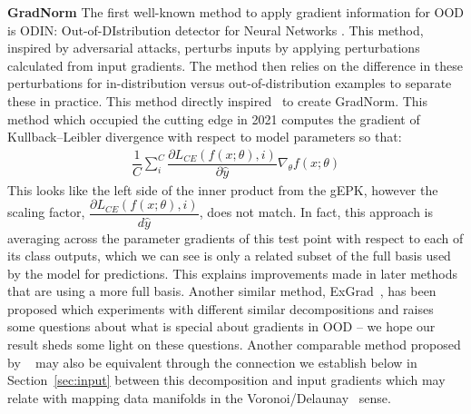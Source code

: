 \textbf{GradNorm}
The first well-known method to apply gradient information for OOD is  ODIN: Out-of-DIstribution detector for Neural Networks  \citet{liang2018}. This method, inspired by adversarial attacks, perturbs inputs by applying perturbations calculated from input gradients. The method then relies on the difference in these perturbations for in-distribution versus out-of-distribution examples to separate these in practice. This method directly inspired~\citet{huang2021} to create GradNorm. This method which occupied the cutting edge in 2021 computes the gradient of Kullback–Leibler divergence with respect to model parameters so that:
\begin{align}
    \dfrac{1}{C} \sum_i^C \dfrac{\partial L_{CE}(f(x; \theta), i)}{\partial\hat y}\nabla_\theta f(x; \theta)
\end{align}
This looks like the left side of the inner product from the gEPK, however the scaling factor, $\dfrac{\partial L_{CE}(f(x; \theta), i)}{d\hat y}$, does not match. In fact, this approach is averaging across the parameter gradients of this test point with respect to each of its class outputs, which we can see is only a related subset of the full basis used by the model for predictions. This explains improvements made in later methods that are using a more full basis. Another similar method, ExGrad~\citep{igoe2022}, has been proposed which experiments with different similar decompositions and raises some questions about what is special about gradients in OOD -- we hope our result sheds some light on these questions. Another comparable method proposed by ~\citet{sun2022deep} may also be equivalent through the connection we establish below in Section~\ref{sec:input} between this decomposition and input gradients which may relate with mapping data manifolds in the Voronoi/Delaunay~\citep{gillette2022data} sense. 

